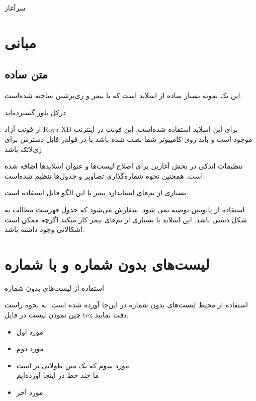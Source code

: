 \documentclass{beamer}
\makeatletter
\newcommand{ \RTList}{\raggedleft\rightskip\@totalleftmargin}
\makeatother
\begin{document}
\begin{persian}
\begin{frame}{سرآغاز}
\section{مبانی}
\subsection{متن ساده}
این یک نمونه بسیار ساده از اسلاید است که با بیمر و زی‌پرشین ساخته شده‌است.

 درکل بلور گسترده‌اند

از فونت آزاد Roya XB برای این اسلاید استفاده شده‌است. این فونت در اینترنت موجود است و باید روی کامپیوتر شما نصب شده باشد یا در فولدر قابل دسترس برای زی‌لاتک باشد

تنظیمات اندکی در بخش آغازین برای اصلاح لیست‌ها و عنوان اسلایدها اضافه شده است. همچنین نحوه شماره‌گذاری تصاویر و جدول‌ها تنظیم شده‌است.

بسیاری از تم‌های استاندارد بیمر با این الگو قابل استفاده است.

استفاده از پانویس توصیه نمی شود. سفارش می‌شود که جدول فهرست مطالب به شکل دستی باشد. این اسلاید با بسیاری از تم‌های بیمر کار میکند اگرچه ممکن است اشکالاتی وجود داشته باشد.
\end{frame}

\section{لیست‌های بدون شماره و با شماره}
\begin{frame}{استفاده از لیست‌های بدون شماره}

استفاده از محیط لیست‌های بدون شماره در این‌جا آورده شده است. به نحوه راست چین نمودن لیست در فایل tex دقت نمایید.
\begin{itemize}\RTList
	\item مورد اول
	\item مورد دوم
	\item مورد سوم که یک متن طولانی تر است\\ ما چند خط در اینجا آورده‌ایم
	\item مورد آخر
\end{itemize}
\end{frame}


\end{persian}
\end{document}
